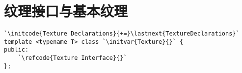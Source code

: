 \section{纹理接口与基本纹理}\label{sec:纹理接口与基本纹理}

\begin{lstlisting}
`\initcode{Texture Declarations}{+=}\lastnext{TextureDeclarations}`
template <typename T> class `\initvar{Texture}{}` {
public:
    `\refcode{Texture Interface}{}`
};
\end{lstlisting}